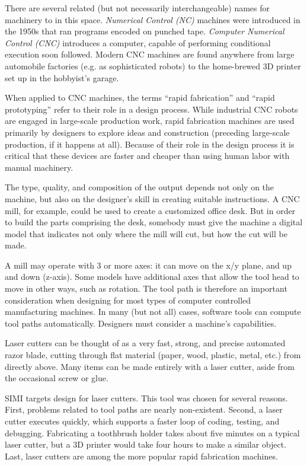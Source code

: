 There are several related (but not necessarily interchangeable) names
for machinery to in this space. \textit{Numerical Control (NC)}
machines were introduced in the 1950s that ran programs encoded on
punched tape. \textit{Computer Numerical Control (CNC)} introduces a
computer, capable of performing conditional execution soon
followed. Modern CNC machines are found anywhere from large automobile
factories (e.g. as sophisticated robots) to the home-brewed 3D printer
set up in the hobbyist's garage.

When applied to CNC machines, the terms ``rapid fabrication'' and
``rapid prototyping'' refer to their role in a design process. While
industrial CNC robots are engaged in large-scale production work,
rapid fabrication machines are used primarily by designers to explore
ideas and construction (preceding large-scale production, if it
happens at all). Because of their role in the design process it is
critical that these devices are faster and cheaper than using human
labor with manual machinery.

The type, quality, and composition of the output depends not only on
the machine, but also on the designer's skill in creating suitable
instructions. A CNC mill, for example, could be used to create a
customized office desk. But in order to build the parts comprising the
desk, somebody must give the machine a digital model that indicates
not only where the mill will cut, but how the cut will be made.

A mill may operate with 3 or more axes: it can move on the x/y plane,
and up and down (z-axis). Some models have additional axes that allow
the tool head to move in other ways, such as rotation. The tool path
is therefore an important consideration when designing for most types
of computer controlled manufacturing machines. In many (but not all)
cases, software tools can compute tool paths automatically. Designers
must consider a machine's capabilities.

Laser cutters can be thought of as a very fast, strong, and precise
automated razor blade, cutting through flat material (paper, wood,
plastic, metal, etc.) from directly above. Many items can be made
entirely with a laser cutter, aside from the occasional screw or glue.

SIMI targets design for laser cutters. This tool was chosen for
several reasons. First, problems related to tool paths are nearly
non-existent. Second, a laser cutter executes quickly, which supports
a faster loop of coding, testing, and debugging. Fabricating a
toothbrush holder takes about five minutes on a typical laser cutter,
but a 3D printer would take four hours to make a similar object. Last,
laser cutters are among the more popular rapid fabrication machines.

